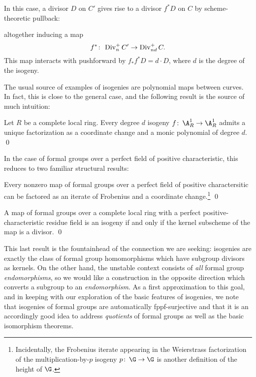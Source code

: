 \begin{remark}
In this case, a divisor $D$ on $C'$ gives rise to a divisor $f^* D$ on $C$ by scheme-theoretic pullback:
\begin{center}
\end{center}
altogether inducing a map \[f^*\colon\thinspace \operatorname{Div}_n^+ C' \to \operatorname{Div}_{nd}^+ C.\]  This map interacts with pushforward by $f_* f^* D = d \cdot D$, where $d$ is the degree of the isogeny.
\end{remark}

The usual source of examples of isogenies are polynomial maps between curves.  In fact, this is close to the general case, and the following result is the source of much intuition:
\begin{lemma}
Let $R$ be a complete local ring.  Every degree $d$ isogeny $f\co \A^1_R \to \A^1_R$ admits a unique factorization as a coordinate change and a monic polynomial of degree $d$. \qed
\end{lemma}

\noindent In the case of formal groups over a perfect field of positive characteristic, this reduces to two familiar structural results:

\begin{corollary}
Every nonzero map of formal groups over a perfect field of positive charactersitic can be factored as an iterate of Frobenius and a coordinate change.\footnote{Incidentally, the Frobenius iterate appearing in the Weierstrass factorization of the multiplication-by-$p$ isogeny $p\co \G \to \G$ is another definition of the height of $\G$.} \qed
\end{corollary}

\begin{corollary}
A map of formal groups over a complete local ring with a perfect positive-characteristic residue field is an isogeny if and only if the kernel subscheme of the map is a divisor. \qed
\end{corollary}

This last result is the fountainhead of the connection we are seeking: isogenies are exactly the class of formal group homomorphisms which have subgroup divisors as kernels.  On the other hand, the unstable context consists of \emph{all} formal group \emph{endomorphisms}, so we would like a construction in the opposite direction which converts a subgroup to an \emph{endomorphism}.  As a first approximation to this goal, and in keeping with our exploration of the basic features of isogenies, we note that isogenies of formal groups are automatically fppf-surjective and that it is an accordingly good idea to address \emph{quotients} of formal groups as well as the basic isomorphism theorems.

